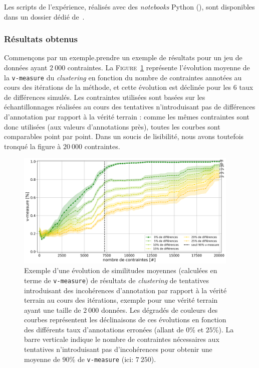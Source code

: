 			\begin{leftBarInformation}
				Les scripts de l'expérience, réalisés avec des \textit{notebooks} Python (\cite{van-rossum-drake:2009:python-reference-manual}), sont disponibles dans un dossier dédié de~\cite{schild:2021:cognitivefactory-interactiveclusteringcomparativestudy}.
			\end{leftBarInformation}
		
		
		\subsubsection{Résultats obtenus}
			
			Commençons par un exemple.prendre un exemple de résultats pour un jeu de données ayant $2~000$ contraintes.
			La \textsc{Figure~\ref{figure:4.6.2-ETUDE-ROBUSTESSE-SIMULATION-IMPACT-DIFFERENCES-2000}} représente l'évolution moyenne de la \texttt{v-measure} du \textit{clustering} en fonction du nombre de contraintes annotées au cours des itérations de la méthode, et cette évolution est déclinée pour les $6$ taux de différences simulés.
			Les contraintes utilisées sont basées sur les échantillonnages réalisées au cours des tentatives n'introduisant pas de différences d'annotation par rapport à la vérité terrain : comme les mêmes contraintes sont donc utilisées (aux valeurs d'annotations près), toutes les courbes sont comparables point par point.
			Dans un soucis de lisibilité, nous avons toutefois tronqué la figure à $20~000$ contraintes.
			
			\begin{figure}[!htb]
				\centering
				\includegraphics[width=0.95\textwidth]{figures/etude-erreur-simulation-impact-size-2000}
				\caption{
					Exemple d'une évolution de similitudes moyennes (calculées en terme de \texttt{v-measure}) de résultats de \textit{clustering} de tentatives introduisant des incohérences d'annotation par rapport à la vérité terrain au cours des itérations, exemple pour une vérité terrain ayant une taille de $2~000$ données.
					Les dégradés de couleurs des courbes représentent les déclinaisons de ces évolutions en fonction des différents taux d'annotations erronées (allant de $0$\% et $25$\%).
					La barre verticale indique le nombre de contraintes nécessaires aux tentatives n'introduisant pas d'incohérences pour obtenir une moyenne de $90$\% de \texttt{v-measure} (ici: $7~250$).
				}
				\label{figure:4.6.2-ETUDE-ROBUSTESSE-SIMULATION-IMPACT-DIFFERENCES-2000}
			\end{figure}
			
